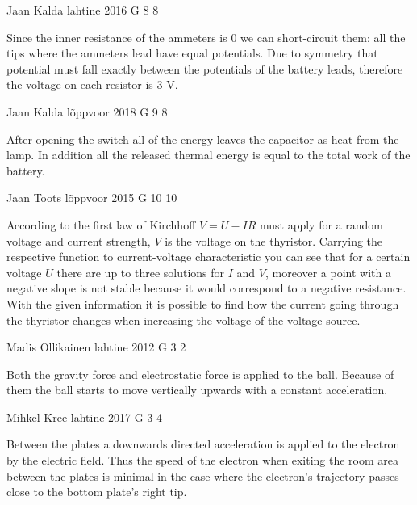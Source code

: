 \documentclass[11pt]{article}
\begin{document}
{Jaan Kalda} %
{lahtine} %
{2016} %
{G 8} %
{8} %
{

\ifEngHint
Since the inner resistance of the ammeters is 0 we can short-circuit them: all the tips where the ammeters lead have equal potentials. Due to symmetry that potential must fall exactly between the potentials of the battery leads, therefore the voltage on each resistor is 3 V.
\fi
}

{Jaan Kalda} %
{lõppvoor} %
{2018} %
{G 9} %
{8} %
{

\ifEngHint
After opening the switch all of the energy leaves the capacitor as heat from the lamp. In addition all the released thermal energy is equal to the total work of the battery.
\fi
}

{Jaan Toots} %
{lõppvoor} %
{2015} %
{G 10} %
{10} %
{

\ifEngHint
According to the first law of Kirchhoff $V = U - IR$ must apply for a random voltage and current strength, $V$ is the voltage on the thyristor. Carrying the respective function to current-voltage characteristic you can see that for a certain voltage $U$ there are up to three solutions for $I$ and $V$, moreover a point with a negative slope is not stable because it would correspond to a negative resistance. With the given information it is possible to find how the current going through the thyristor changes when increasing the voltage of the voltage source.
\fi
}

{Madis Ollikainen} %
{lahtine} %
{2012} %
{G 3} %
{2} %
{

\ifEngHint
Both the gravity force and electrostatic force is applied to the ball. Because of them the ball starts to move vertically upwards with a constant acceleration.
\fi
}

{Mihkel Kree} %
{lahtine} %
{2017} %
{G 3} %
{4} %
{

\ifEngHint
Between the plates a downwards directed acceleration is applied to the electron by the electric field. Thus the speed of the electron when exiting the room area between the plates is minimal in the case where the electron's trajectory passes close to the bottom plate's right tip.
\fi
}
\end{document}
